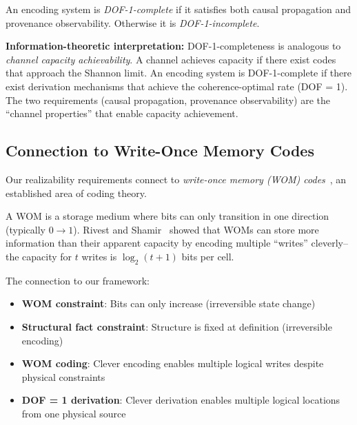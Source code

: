 \begin{definition}\label{def:dof-complete}
An encoding system is \emph{DOF-1-complete} if it satisfies both causal propagation and provenance observability. Otherwise it is \emph{DOF-1-incomplete}.
\end{definition}

\textbf{Information-theoretic interpretation:} DOF-1-completeness is analogous to \emph{channel capacity achievability}. A channel achieves capacity if there exist codes that approach the Shannon limit. An encoding system is DOF-1-complete if there exist derivation mechanisms that achieve the coherence-optimal rate (DOF = 1). The two requirements (causal propagation, provenance observability) are the ``channel properties'' that enable capacity achievement.

\subsection{Connection to Write-Once Memory Codes}\label{sec:wom-connection}

Our realizability requirements connect to \emph{write-once memory (WOM) codes}~\cite{rivest1982wom,wolf1984wom}, an established area of coding theory.

A WOM is a storage medium where bits can only transition in one direction (typically $0 \to 1$). Rivest and Shamir~\cite{rivest1982wom} showed that WOMs can store more information than their apparent capacity by encoding multiple ``writes'' cleverly--the capacity for $t$ writes is $\log_2(t+1)$ bits per cell.

The connection to our framework:
\begin{itemize}
\tightlist
\item \textbf{WOM constraint}: Bits can only increase (irreversible state change)
\item \textbf{Structural fact constraint}: Structure is fixed at definition (irreversible encoding)
\item \textbf{WOM coding}: Clever encoding enables multiple logical writes despite physical constraints
\item \textbf{DOF = 1 derivation}: Clever derivation enables multiple logical locations from one physical source
\end{itemize}

